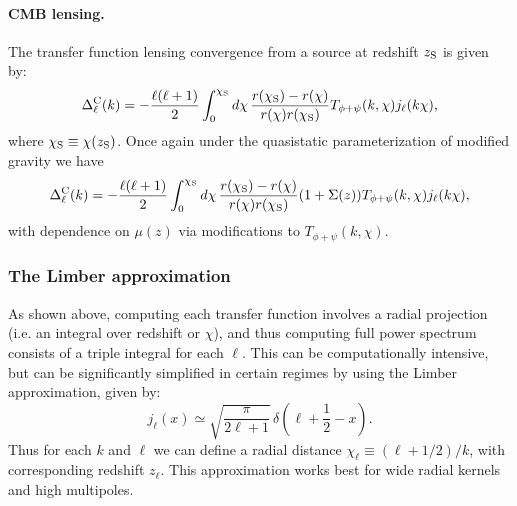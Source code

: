 \documentclass[\docopts]{\docclass}
\begin{document}
\paragraph{\bf CMB lensing.} The transfer function lensing convergence from a source at redshift $z_{\rm S}$ is given by:
\begin{equation} \label{eq:transfer_cmb_lensing}
  \Delta_\ell^{\rm C}(k)=-\frac{\ell(\ell+1)}{2}\int_0^{\chi_{\rm S}} d\chi\,\frac{r(\chi_{\rm S})-r(\chi)}{r(\chi)r(\chi_{\rm S})}T_{\phi+\psi}(k,\chi) j_\ell(k\chi),
\end{equation}
where $\chi_{\rm S}\equiv\chi(z_{\rm S})$. Once again under the quasistatic parameterization of modified gravity we have
\begin{equation} \label{eq:transfer_cmb_lensing}
  \Delta_\ell^{\rm C}(k)=-\frac{\ell(\ell+1)}{2}\int_0^{\chi_{\rm S}} d\chi\,\frac{r(\chi_{\rm S})-r(\chi)}{r(\chi)r(\chi_{\rm S})}(1+\Sigma(z))T_{\phi+\psi}(k,\chi) j_\ell(k\chi),
\end{equation}
with dependence on $\mu(z)$ via modifications to $T_{\phi+\psi}(k,\chi)$.

\subsubsection{The Limber approximation}
As shown above, computing each transfer function involves a radial projection (i.e. an integral over redshift or $\chi$), and thus computing full power spectrum consists of a triple integral for each $\ell$. This can be computationally intensive, but can be significantly simplified in certain regimes by using the Limber approximation, given by:
\begin{equation}
 j_\ell(x)\simeq\sqrt{\frac{\pi}{2\ell+1}}\,\delta\left(\ell+\frac{1}{2}-x\right).
\end{equation}
Thus for each $k$ and $\ell$ we can define a radial distance $\chi_\ell\equiv(\ell+1/2)/k$, with corresponding redshift $z_\ell$. This approximation works best for wide radial kernels and high multipoles.
\end{document}
